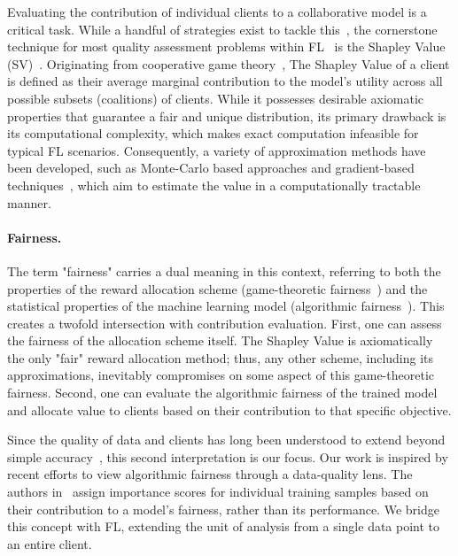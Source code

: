 \documentclass{uai2026}
\begin{document}
Evaluating the contribution of individual clients to a collaborative model is a critical task. While a handful of strategies exist to tackle this~\cite{huang2020exploratory,jiang2023opendataval}, the cornerstone technique for most quality assessment problems within FL~\cite{jain2020overview} is the Shapley Value (SV)~\cite{winter2002shapley,rozemberczki2022shapley}. Originating from cooperative game theory~\cite{shapley1951notes}, The Shapley Value of a client is defined as their average marginal contribution to the model's utility across all possible subsets (coalitions) of clients. While it possesses desirable axiomatic properties that guarantee a fair and unique distribution, its primary drawback is its computational complexity, which makes exact computation infeasible for typical FL scenarios. Consequently, a variety of approximation methods have been developed, such as Monte-Carlo based approaches and gradient-based techniques~\cite{ghorbani2019data,liu2022gtg}, which aim to estimate the value in a computationally tractable manner.

\paragraph{Fairness. }

The term "fairness" carries a dual meaning in this context, referring to both the properties of the reward allocation scheme (game-theoretic fairness~\cite{rabin1993incorporating}) and the statistical properties of the machine learning model (algorithmic fairness~\cite{kleinberg2018algorithmic}). This creates a twofold intersection with contribution evaluation. First, one can assess the fairness of the allocation scheme itself. The Shapley Value is axiomatically the only "fair" reward allocation method; thus, any other scheme, including its approximations, inevitably compromises on some aspect of this game-theoretic fairness. Second, one can evaluate the algorithmic fairness of the trained model and allocate value to clients based on their contribution to that specific objective.

Since the quality of data and clients has long been understood to extend beyond simple accuracy~\cite{wang1996beyond}, this second interpretation is our focus. Our work is inspired by recent efforts to view algorithmic fairness through a data-quality lens. The authors in~\cite{arnaiztowards} assign importance scores for individual training samples based on their contribution to a model's fairness, rather than its performance. We bridge this concept with FL, extending the unit of analysis from a single data point to an entire client.
\end{document}
